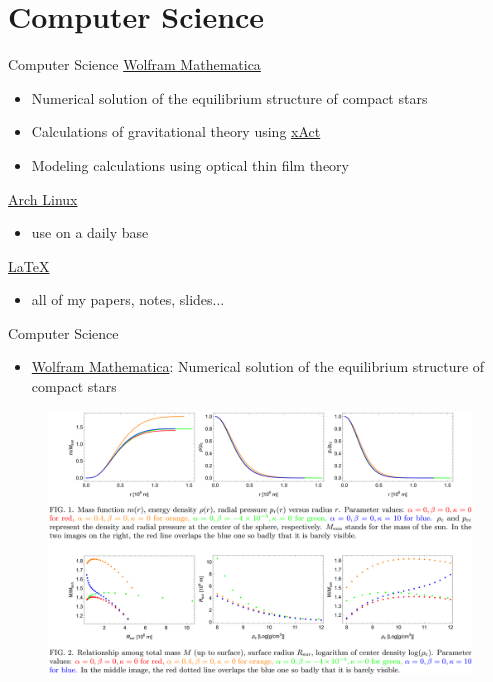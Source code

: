 \documentclass[9pt,aspectratio=169,hyperref=colorlinks]{beamer}
\begin{document}
\section{Computer Science}
\begin{frame}{Computer Science}
    \href{https://www.wolfram.com/mathematica/}{Wolfram Mathematica}
    \begin{itemize}
        \item Numerical solution of the equilibrium structure of compact stars
        \item Calculations of gravitational theory using \href{http://xact.es/index.html}{xAct}
        \item Modeling calculations using optical thin film theory
    \end{itemize}

    \href{https://archlinux.org}{Arch Linux}
    \begin{itemize}
        \item use on a daily base
    \end{itemize}

    \href{https://www.latex-project.org}{\LaTeX}
    \begin{itemize}
        \item all of my papers, notes, slides...
    \end{itemize}
\end{frame}

\begin{frame}{Computer Science}
    \begin{itemize}
        \item \href{https://www.wolfram.com/mathematica/}{Wolfram Mathematica}: Numerical solution of the equilibrium structure of compact stars
    \end{itemize}

    \begin{figure}
        \centering
        \includegraphics[scale=0.2]{CV/figs/2210.01574.png}
    \end{figure}
\end{frame}
\end{document}
